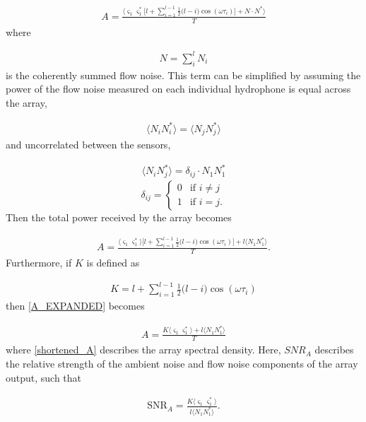 \documentclass[12pt,journal,onecolumn]{IEEEtran}
\begin{document}
\begin{align}
A =\frac{\langle \varsigma_1\varsigma^*_1 \Big [ l + \sum \limits_{i=1}^{l-1}\frac{1}{2}\Big (l - i \Big )\cos(\omega \tau_{i}) \Big ] + N\cdot N^* \rangle}{T}
\label{A_expanded}
\end{align}
where

\begin{align}
N = \sum_{i}^{l} N_i 
\label{N}
\end{align}
is the coherently summed flow noise. This term can be simplified by assuming the power of the flow noise measured on each individual hydrophone is equal across the array, 

\begin{align}
\langle N_i N^*_i \rangle = \langle N_j N^*_j \rangle 
\label{assume}
\end{align}
and uncorrelated between the sensors,

\begin{align}
\langle N_i N^*_j \rangle = \delta_{ij} \cdot N_1 N^*_1
\label{ASSUME}
\end{align} 
\[
\delta_{ij}=
\begin{cases}
0&\text{if }i\neq j\,\\
1 &\text{if }i=j.
\end{cases}
\]
Then the total power received by the array becomes 

\begin{align}
A = \frac{\langle \varsigma_1\varsigma^*_1 \rangle \Big [ l + \sum \limits_{i=1}^{l-1}\frac{1}{2}\Big (l - i \Big )\cos(\omega \tau_{i}) \Big ] + l\langle N_1 N^*_1 \rangle }{T}.
\label{A_EXPANDED}
\end{align}
Furthermore, if $K$ is defined as

\begin{align}
K =  l + \sum_{i=1}^{l-1}\frac{1}{2}\Big (l - i \Big )\cos(\omega \tau_{i}) 
\label{shortened}
\end{align}
then \eqref{A_EXPANDED} becomes

\begin{align}
A = \frac{K\langle  \varsigma_1 \varsigma^*_1 \rangle  + l\langle N_1 N^*_1 \rangle}{T}
\label{shortened_A}
\end{align}
where \eqref{shortened_A} describes the array spectral density. Here, $SNR_A$ describes the relative strength of the ambient noise and flow noise components of the array output, such that

\begin{align}
\text{SNR}_A = \frac{K  \langle \varsigma_1 \varsigma^*_1 \rangle}{l\langle N_1 N^*_1 \rangle}.
\label{SNR_A}
\end{align}
\end{document}
